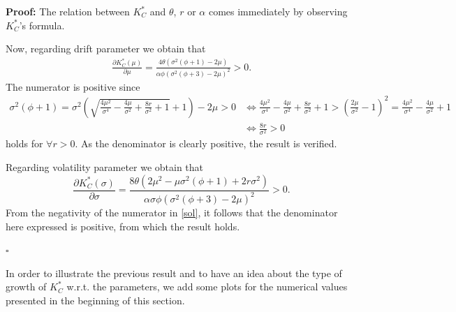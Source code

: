 \textbf{Proof:}
The relation between $K^*_C$ and $\theta$, $r$ or $\alpha$ comes immediately by observing $K^*_C$'s formula.

Now, regarding drift parameter we obtain that
 \begin{align*}
\frac{\partial K^*_C(\mu)}{\partial \mu}=
\frac{4 \theta \left(\sigma ^2 \left(\phi+1\right)-2 \mu \right)}{\alpha \phi \left(\sigma ^2 \left(\phi+3\right)-2 \mu \right)^2}>0.
\end{align*}
The numerator is positive since
\begin{align}
\label{cond2}
\sigma ^2 (\phi+1)=\sigma ^2 \left(\sqrt{\frac{4 \mu ^2}{\sigma ^4}-\frac{4 \mu }{\sigma ^2}+\frac{8 r}{\sigma ^2}+1}+1\right)-2 \mu>0 
& \Leftrightarrow
\frac{4 \mu ^2}{\sigma ^4}-\frac{4 \mu }{\sigma ^2}+\frac{8 r}{\sigma ^2}+1 > \left( \frac{2 \mu}{\sigma^2}-1 \right)^2=\frac{4 \mu ^2}{\sigma ^4}-\frac{4 \mu }{\sigma ^2}+1 \nonumber\\
& \Leftrightarrow
\frac{8 r}{\sigma ^2}>0 \nonumber
\end{align}
holds for $\forall r> 0$. As the denominator is clearly positive, the result is verified.

Regarding volatility parameter we obtain that
\begin{equation*}
    \frac{\partial K^*_C(\sigma)}{\partial \sigma}= 
\frac{8 \theta \left(2 \mu ^2-\mu  \sigma ^2 \left( \phi+1 \right)+2 r \sigma ^2 \right)}{\alpha \sigma  \phi  \left( \sigma ^2 \left( \phi+3 \right)-2 \mu \right)^2}>0.
\end{equation*}
From the negativity of the numerator in \eqref{sol}, it follows that the denominator here expressed is positive, from which the result holds.

\begin{flushright}
	$\square$
\end{flushright}

In order to illustrate the previous result and to have an idea about the type of growth of $K^*_C$ w.r.t. the parameters, we add some plots for the numerical values presented in the beginning of this section.

